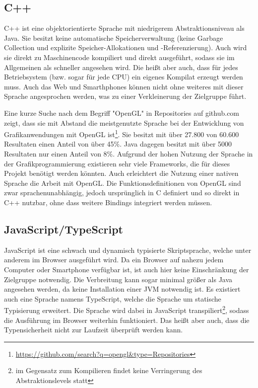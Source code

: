 \subsection{C++}
C++ ist eine objektorientierte Sprache mit niedrigerem Abstraktionsniveau als Java. Sie besitzt keine automatische Speicherverwaltung (keine Garbage Collection und explizite Speicher-Allokationen und -Referenzierung). Auch wird sie direkt zu Maschinencode kompiliert und direkt ausgeführt, sodass sie im Allgemeinen als schneller angesehen wird. Die heißt aber auch, dass für jedes Betriebsystem (bzw. sogar für jede CPU) ein eigenes Kompilat erzeugt werden muss. Auch das Web und Smarthphones können nicht ohne weiteres mit dieser Sprache angesprochen werden, was zu einer Verkleinerung der Zielgruppe führt.

Eine kurze Suche nach dem Begriff "OpenGL" in Repositories auf github.com zeigt, dass sie mit Abstand die meistgenutzte Sprache bei der Entwicklung von Grafikanwendungen mit OpenGL ist\footnote{\url{https://github.com/search?q=opengl&type=Repositories}}. Sie besitzt mit über 27.800 von 60.600 Resultaten einen Anteil von über 45\%. Java dagegen besitzt mit über 5000 Resultaten nur einen Anteil von 8\%. Aufgrund der hohen Nutzung der Sprache in der Grafikprogrammierung existieren sehr viele Frameworks, die für dieses Projekt benötigt werden könnten. Auch erleichtert die Nutzung einer nativen Sprache die Arbeit mit OpenGL. Die Funktionsdefinitionen von OpenGL sind zwar sprachenunabhängig, jedoch ursprünglich in C definiert und so direkt in C++ nutzbar, ohne dass weitere Bindings integriert werden müssen.

\subsection{JavaScript/TypeScript}
JavaScript ist eine schwach und dynamisch typisierte Skriptsprache, welche unter anderem im Browser ausgeführt wird. Da ein Browser auf nahezu jedem Computer oder Smartphone verfügbar ist, ist auch hier keine Einschränkung der Zielgruppe notwendig. Die Verbreitung kann sogar minimal größer als Java angesehen werden, da keine Installation einer JVM notwendig ist. Es existiert auch eine Sprache namens TypeScript, welche die Sprache um statische Typisierung erweitert. Die Sprache wird dabei in JavaScript transpiliert\footnote{im Gegensatz zum Kompilieren findet keine Verringerung des Abstraktionslevels statt}, sodass die Ausführung im Browser weiterhin funktioniert. Das heißt aber auch, dass die Typensicherheit nicht zur Laufzeit überprüft werden kann.

